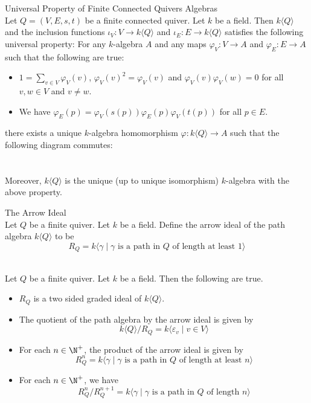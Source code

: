 \documentclass[a4paper]{article}
\begin{document}
\begin{prp}{Universal Property of Finite Connected Quivers Algebras}{}\\
Let $Q=(V,E,s,t)$ be a finite connected quiver. Let $k$ be a field. Then $k\langle Q\rangle$ and the inclusion functions $\iota_V:V\to k\langle Q\rangle$ and $\iota_E:E\to k\langle Q\rangle$ satisfies the following universal property: For any $k$-algebra $A$ and any maps $\varphi_V:V\to A$ and $\varphi_E:E\to A$ such that the following are true: 
\begin{itemize}
\item $1=\sum_{v\in V}\varphi_V(v)$, $\varphi_V(v)^2=\varphi_V(v)$ and $\varphi_V(v)\varphi_V(w)=0$ for all $v,w\in V$ and $v\neq w$. 
\item We have $\varphi_E(p)=\varphi_V(s(p))\varphi_E(p)\varphi_V(t(p))$ for all $p\in E$. 
\end{itemize}
there exists a unique $k$-algebra homomorphism $\varphi:k\langle Q\rangle\to A$ such that the following diagram commutes: \\
\\~\\
Moreover, $k\langle Q\rangle$ is the unique (up to unique isomorphism) $k$-algebra with the above property. 
\end{prp}

\begin{defn}{The Arrow Ideal}{}\\
Let $Q$ be a finite quiver. Let $k$ be a field. Define the arrow ideal of the path algebra $k\langle Q\rangle$ to be $$R_Q=k\langle\gamma\;|\;\gamma\text{ is a path in }Q\text{ of length at least }1\rangle$$
\end{defn}

\begin{lmm}{}{}\\
Let $Q$ be a finite quiver. Let $k$ be a field. Then the following are true. 
\begin{itemize}
\item $R_Q$ is a two sided graded ideal of $k\langle Q\rangle$. 
\item The quotient of the path algebra by the arrow ideal is given by $$k\langle Q\rangle/R_Q=k\langle\varepsilon_v\;|\;v\in V\rangle$$
\item For each $n\in\N^+$, the product of the arrow ideal is given by $$R_Q^n=k\langle\gamma\;|\;\gamma\text{ is a path in }Q\text{ of length at least }n\rangle$$
\item For each $n\in\N^+$, we have $$R_Q^n/R_Q^{n+1}=k\langle\gamma\;|\;\gamma\text{ is a path in }Q\text{ of length }n\rangle$$
\end{itemize}
\end{lmm}
\end{document}
